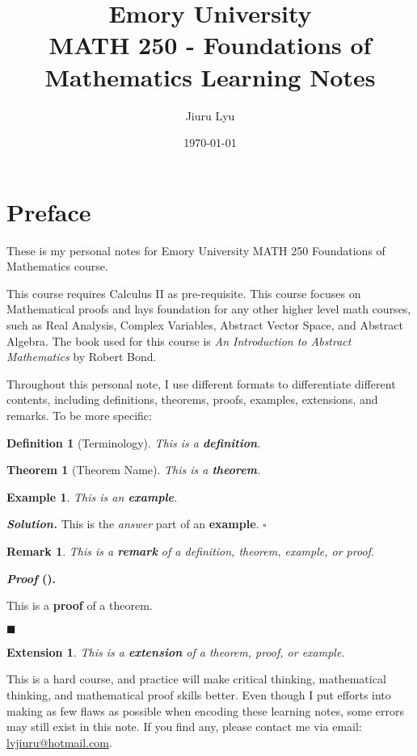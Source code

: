 \documentclass[12pt,a4paper]{article}
\title{Emory University\\\textbf{MATH 250 - Foundations of Mathematics Learning Notes}}
\author{Jiuru Lyu}
\date{\today}
\newcounter{nprf}[subsection]
\newtheorem{thm}{Theorem}[subsection]
\newtheorem{df}{Definition}[subsection]
\newtheorem{eg}{Example}[subsection]
\newenvironment*{sol}{\par\indent\textbf{\textit{Solution. }}}{\hfill{$\square$}\par}
\newtheorem*{rmk}{\indent Remark}
\newenvironment*{prf}{\par\indent\textbf{\textit{Proof} (\stepcounter{nprf}\thenprf). }\par}{\par\hfill $\blacksquare$\par}
\newtheorem*{ext}{\indent Extension}
\begin{document}
\maketitle
\tableofcontents
\newpage

\section*{Preface}
These is my personal notes for Emory University MATH 250 Foundations of Mathematics course. 

This course requires Calculus II as pre-requisite. This course focuses on Mathematical proofs and lays foundation for any other higher level math courses, such as Real Analysis, Complex Variables, Abstract Vector Space, and Abstract Algebra. The book used for this course is \textit{An Introduction to Abstract Mathematics} by Robert Bond. 

Throughout this personal note, I use different formats to differentiate different contents, including definitions, theorems, proofs, examples, extensions, and remarks. To be more specific: 
\begin{df}[Terminology]
    This is a \textbf{definition}.	
\end{df}
\begin{thm}[Theorem Name]
    This is a \textbf{theorem}.	
\end{thm}
\begin{eg}
    This is  an \textbf{example}. 
\end{eg}

\begin{sol}
    This is the \textit{answer} part of an \textbf{example}. 
\end{sol}
\begin{rmk}
	This is a \textbf{remark} of a definition, theorem, example, or proof. 
\end{rmk}

\begin{prf}
	This is a \textbf{proof} of a theorem. 
\end{prf}
\begin{ext}
	This is a \textbf{extension} of a theorem, proof, or example. 	
\end{ext}
This is a hard course, and practice will make critical thinking, mathematical thinking, and mathematical proof skills better. Even though I put efforts into making as few flaws as possible when encoding these learning notes, some errors may still exist in this note. If you find any, please contact me via email: \url{lvjiuru@hotmail.com}. 
\end{document}
